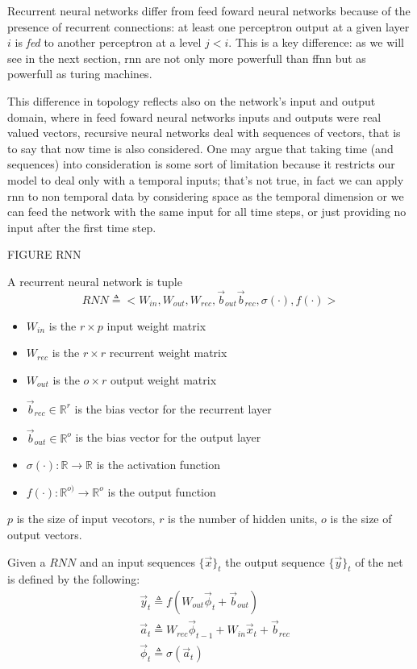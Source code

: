 Recurrent neural networks differ from feed foward neural networks because of the presence of recurrent connections: at least one perceptron output at a given layer $i$ is \textit{fed} to another perceptron
at a level $j<i$. This is a key difference: as we will see in the next section, rnn are not only more powerfull than ffnn but as powerfull as turing machines.


This difference in topology reflects also on the network's input and output domain, where in feed foward neural networks inputs and outputs were real valued vectors, recursive neural networks deal with
sequences of vectors, that is to say that now time is also considered. One may argue that taking time (and sequences) into consideration is some sort of limitation because it restricts our model to deal only
with a temporal inputs; that's not true, in fact we can apply rnn to non temporal data by considering space as the temporal dimension or we can feed the network with the same input for all time steps, or just
providing no input after the first time step.

FIGURE RNN


\begin{defn}
\label{def_rnn}
A recurrent  neural network is tuple
$$RNN\triangleq< W_{in}, W_{out}, W_{rec},\vec{b}_{out} \vec{b}_{rec} ,\sigma(\cdot),f(\cdot)>$$
\begin{itemize}
 \item $W_{in}$ is the $r\times p$ input weight matrix
 \item $W_{rec}$ is the $r\times r$ recurrent weight matrix
 \item $W_{out}$ is the $o \times r$ output weight matrix
 \item $\vec{b}_{rec} \in \mathbb{R}^{r}$ is the bias vector for the recurrent layer
 \item $\vec{b}_{out} \in \mathbb{R}^{o}$ is the bias vector for the output layer
 \item $\sigma(\cdot): \mathbb{R}\rightarrow \mathbb{R}$ is the activation function
 \item $f(\cdot): \mathbb{R}^{o)}\rightarrow \mathbb{R}^{o}$ is the output function
\end{itemize}

$p$ is the size of input vecotors, $r$ is the number of hidden units, $o$ is the size of output vectors. 
\end{defn}

Given a $RNN$ and an input sequences $\{\vec{x}\}_t$ the output sequence $\{\vec{y}\}_t$ of the net is defined by the following:
\begin{align}
&\vec{y}_t \triangleq f(W_{out}\vec{\phi}_t + \vec{b}_{out})\\
&\vec{a}_t \triangleq W_{rec}\vec{\phi}_{t-1}+W_{in}\vec{x}_t+\vec{b}_{rec}\\
&\vec{\phi}_t \triangleq  \sigma(\vec{a}_t)
\end{align}

